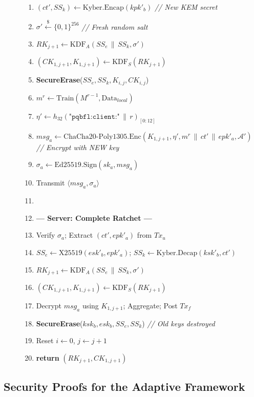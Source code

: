\documentclass[journal, 10pt, twocolumn]{IEEEtran}
\begin{document}
\begin{figure}[!t]
\begin{enumerate}
    \item $(ct', SS_k) \leftarrow \text{Kyber.Encap}(kpk'_b)$ \quad \textit{// New KEM secret}
    \item $\sigma' \xleftarrow{\$} \{0,1\}^{256}$ \quad \textit{// Fresh random salt}
    \item $RK_{j+1} \leftarrow \text{KDF}_A(SS_e \,\|\, SS_k, \sigma')$
    \item $(CK_{1,j+1}, K_{1,j+1}) \leftarrow \text{KDF}_S(RK_{j+1})$
    \item \textbf{SecureErase}($SS_e, SS_k, K_{i,j}, CK_{i,j}$)
    \item $m^r \leftarrow \text{Train}(M^{r-1}, \text{Data}_{local})$
    \item $\eta' \leftarrow h_{32}(\texttt{"pqbfl:client:"} \,\|\, r)_{[0:12]}$
    \item $msg_a \leftarrow \text{ChaCha20-Poly1305.Enc}(K_{1,j+1}, \eta', m^r \,\|\, ct' \,\|\, epk'_a, \mathcal{A}')$ \quad \textit{// Encrypt with NEW key}
    \item $\sigma_a \leftarrow \text{Ed25519.Sign}(sk_a, msg_a)$
    \item Transmit $\langle msg_a, \sigma_a \rangle$
    \item[]
    \item[] \textbf{--- Server: Complete Ratchet ---}
    \item Verify $\sigma_a$; Extract $(ct', epk'_a)$ from $Tx_u$
    \item $SS_e \leftarrow \text{X25519}(esk'_b, epk'_a)$; \quad $SS_k \leftarrow \text{Kyber.Decap}(ksk'_b, ct')$
    \item $RK_{j+1} \leftarrow \text{KDF}_A(SS_e \,\|\, SS_k, \sigma')$
    \item $(CK_{1,j+1}, K_{1,j+1}) \leftarrow \text{KDF}_S(RK_{j+1})$
    \item Decrypt $msg_a$ using $K_{1,j+1}$; Aggregate; Post $Tx_f$
    \item \textbf{SecureErase}($ksk_b, esk_b, SS_e, SS_k$) \quad \textit{// Old keys destroyed}
    \item Reset $i \leftarrow 0$, $j \leftarrow j+1$
    \item \textbf{return} $(RK_{j+1}, CK_{1,j+1})$
\end{enumerate}
\hrulefill
\end{figure}

\subsection{Security Proofs for the Adaptive Framework}
\end{document}
